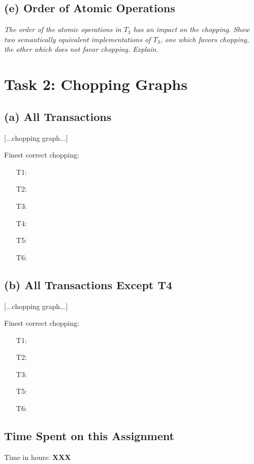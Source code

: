 \documentclass[11pt]{scrartcl}
\begin{document}
\subsection*{(e) Order of Atomic Operations}

{\it The order of the atomic operations in $T_3$ has an impact on the
  chopping. Show two semantically equivalent implementations of $T_3$,
  one which favors chopping, the other which does not favor
  chopping. Explain.}


\section*{Task 2: Chopping Graphs}

\subsection*{(a) All Transactions}

\medskip

[...chopping graph...]

\medskip

\noindent Finest correct chopping:
\begin{enumerate}
\item[T1:]
\item[T2:]
\item[T3:] 
\item[T4:]
\item[T5:]
\item[T6:] 
\end{enumerate}


\subsection*{(b) All Transactions Except T4}

\medskip

[...chopping graph...]

\medskip

\noindent Finest correct chopping:
\begin{enumerate}
\item[T1:]
\item[T2:]
\item[T3:] 
\item[T5:]
\item[T6:] 
\end{enumerate}


\subsection*{Time Spent on this Assignment}

Time in hours: {\bf XXX}


\end{document}

